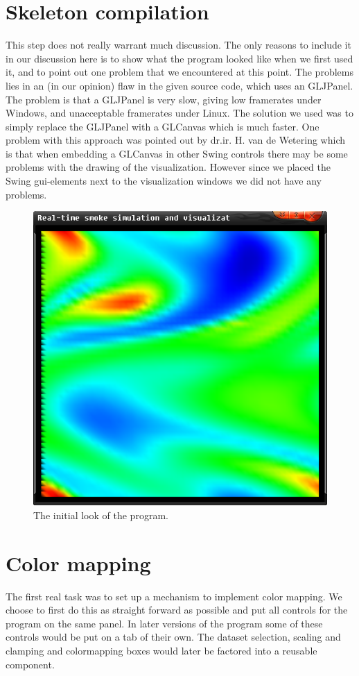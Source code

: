 \documentclass[a4paper,11pt,twoside]{report}
\begin{document}
	\section{Skeleton compilation}
		This step does not really warrant much discussion. The only reasons to include it in our discussion here is to show what the program looked like when we first used it, and to point out one problem that we encountered at this point. The problems lies in an (in our opinion) flaw in the given source code, which uses an GLJPanel. The problem is that a GLJPanel is very slow, giving low framerates under Windows, and unacceptable framerates  under Linux. The solution we used was to simply replace the GLJPanel with a GLCanvas which is much faster. One problem with this approach was pointed out by dr.ir. H. van de Wetering which is that when embedding a GLCanvas in other Swing controls there may be some problems with the drawing of the visualization. However since we placed the Swing gui-elements next to the visualization windows we did not have any problems.
		\begin{figure}[h]
		\centering
		\includegraphics[scale=\imagescalefactor]{images/step1.png}
		\caption{The initial look of the program.}\label{fig:step1}
		\end{figure}
		\clearpage
	\section{Color mapping}
		The first real task was to set up a mechanism to implement color mapping. We choose to first do this as straight forward as possible and put all controls for the program on the same panel. In later versions of the program some of these controls would be put on a tab of their own. The dataset selection, scaling and clamping and colormapping boxes would later be factored into a reusable component.
\end{document}
